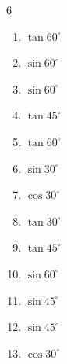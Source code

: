 \begin{multicols}{6}
\begin{enumerate}
  \item $\displaystyle \tan{60^\circ}$


  \item $\displaystyle \sin{60^\circ}$


  \item $\displaystyle \sin{60^\circ}$


\columnbreak %

  \item $\displaystyle \tan{45^\circ}$

        \phantom{$\displaystyle =1$}

  \item $\displaystyle \tan{60^\circ}$


  \item $\displaystyle \sin{30^\circ}$


  \item $\displaystyle \cos{30^\circ}$


  \item $\displaystyle \tan{30^\circ}$


  \item $\displaystyle \tan{45^\circ}$

        \phantom{$\displaystyle =1$}

  \item $\displaystyle \sin{60^\circ}$


  \item $\displaystyle \sin{45^\circ}$


  \item $\displaystyle \sin{45^\circ}$


  \item $\displaystyle \cos{30^\circ}$


\end{enumerate}
\end{multicols}

